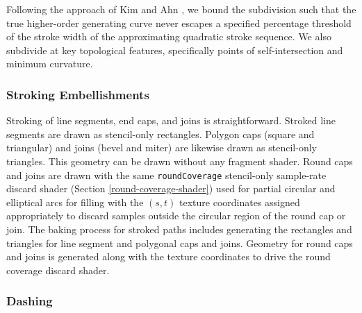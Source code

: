 Following the approach of Kim and Ahn , we bound the
subdivision such that the true higher-order generating curve never escapes
a specified percentage threshold of the stroke width of the approximating
quadratic stroke sequence.  We also subdivide at key topological features,
specifically points of self-intersection and minimum curvature.

\subsubsection{Stroking Embellishments}

Stroking of line segments, end caps, and joins is straightforward.
Stroked line segments are drawn as stencil-only rectangles.  Polygon
caps (square and triangular) and joins (bevel and miter) are likewise
drawn as stencil-only triangles.  This geometry can be drawn without
any fragment shader.  Round caps and joins are drawn with the same
{\tt roundCoverage} stencil-only sample-rate discard shader (Section
\ref{round-coverage-shader}) used for partial circular and elliptical
arcs for filling with the $(s,t)$ texture coordinates assigned appropriately
to discard samples outside the circular region of the round cap or join.
The baking process for stroked paths includes generating the rectangles
and triangles for line segment and polygonal caps and joins.  Geometry for
round caps and joins is generated along with the texture coordinates to
drive the round coverage discard shader.

\subsubsection{Dashing}

